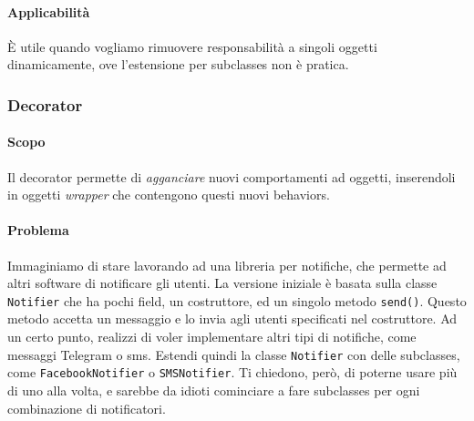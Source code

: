 \documentclass[11pt]{article}
\newcommand{\code}[1]{\texttt{#1}}
\begin{document}
\paragraph{Applicabilità}
È utile quando vogliamo rimuovere responsabilità a singoli oggetti dinamicamente, ove l'estensione per subclasses non è pratica.
\subsubsection{Decorator}
\paragraph{Scopo}
Il decorator permette di \textit{agganciare} nuovi comportamenti ad oggetti, inserendoli in oggetti \textit{wrapper} che contengono questi nuovi behaviors.
\paragraph{Problema}
Immaginiamo di stare lavorando ad una libreria per notifiche, che permette ad altri software di notificare gli utenti. La versione iniziale è basata sulla classe \code{Notifier} che ha pochi field, un costruttore, ed un singolo metodo \code{send()}. Questo metodo accetta un messaggio e lo invia agli utenti specificati nel costruttore. Ad un certo punto, realizzi di voler implementare altri tipi di notifiche, come messaggi Telegram o sms. Estendi quindi la classe \code{Notifier} con delle subclasses, come \code{FacebookNotifier} o \code{SMSNotifier}. Ti chiedono, però, di poterne usare più di uno alla volta, e sarebbe da idioti cominciare a fare subclasses per ogni combinazione di notificatori.
\end{document}

